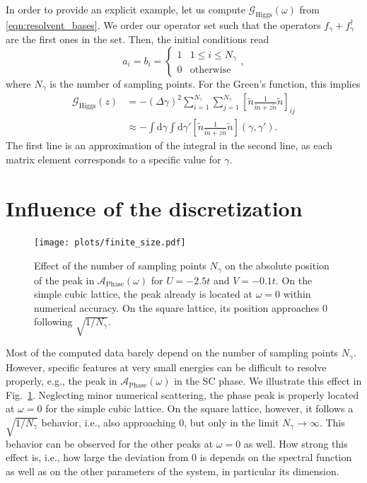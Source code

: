 \documentclass[
    reprint, 
    aps,
    preprintnumbers,
    twocolumn,
    prb,
    superscriptaddress
]{revtex4-2}
\newcommand{\dgamma}{\mathrm{d}\gamma}
\newcommand{\greens}[1]{\mathcal{G}_\text{#1} (\omega)}
\newcommand{\green}[1]{\mathcal{G}_\text{#1}}
\newcommand{\spectral}[1]{\mathcal{A}_\text{#1}  (\omega)}
\newcommand{\bs}{\begin{subequations}}
\newcommand{\es}{\end{subequations}}
\begin{document}
In order to provide an explicit example, 
let us compute $\greens{Higgs}$ from \eqref{eqn:resolvent_bases}.
We order our operator set such that the operators $f_\gamma + f_\gamma^{\dagger}$ are the first ones
in the set. Then, the initial conditions read 
\begin{equation}
    a_i = b_i = \begin{cases}
        1 & 1\le i \le N_\gamma \\
        0 & \text{otherwise}
    \end{cases},
\end{equation}
where $N_\gamma$ is the number of sampling points.
For the Green's function, this implies
\bs
\begin{align}
    \green{Higgs} (z) &= -(\Delta \gamma)^2 \sum_{i=1}^{N_\gamma} \sum_{j=1}^{N_\gamma} \left[ \tilde{n} \frac{1}{\tilde{m} + z \tilde{n}} \tilde{n} \right]_{ij} 
		\\
        &\approx - \int \dgamma \int \dgamma' \left[ \tilde{n} 
				\frac{1}{\tilde{m} + z \tilde{n}} \tilde{n} \right](\gamma, \gamma').
\end{align}
\es
The first line is an approximation of the integral in the second line, as each matrix element corresponds to a specific value for $\gamma$.

\section{Influence of the discretization}
\label{sec:finite_size}

\begin{figure}[htb]
    \centering
    \texttt{[image: plots/finite\_size.pdf]}
    \caption{Effect of the number of  sampling points $N_\gamma$ 
		on the absolute position of the peak in $\spectral{Phase}$ for $U=-2.5t$ and $V=-0.1t$.
    On the simple cubic lattice, the peak already is located at $\omega=0$ within numerical accuracy.
    On the square lattice, its position approaches $0$ following $\sqrt{1/N_\gamma}$.}
    \label{fig:finite_size}
\end{figure}

Most of the computed data barely depend on the number of sampling points $N_\gamma$.
However, specific features at very small energies can be difficult to  resolve properly, e.g., 
the peak in $\spectral{Phase}$ in the SC phase.
We illustrate this effect in Fig.\ \ref{fig:finite_size}.
Neglecting minor numerical scattering, the phase peak is properly located at $\omega=0$ for the simple cubic lattice.
On the square lattice, however, it follows a $\sqrt{1/N_\gamma}$ behavior, i.e., also approaching $0$,
but only in the limit $N_\gamma \to \infty$.
This behavior can be observed for the other peaks at $\omega=0$ as well.
How strong this effect is, i.e., how large the deviation from $0$ is depends on the spectral function
as well as on the other parameters of the system, in particular its dimension.



%
		
\end{document}
